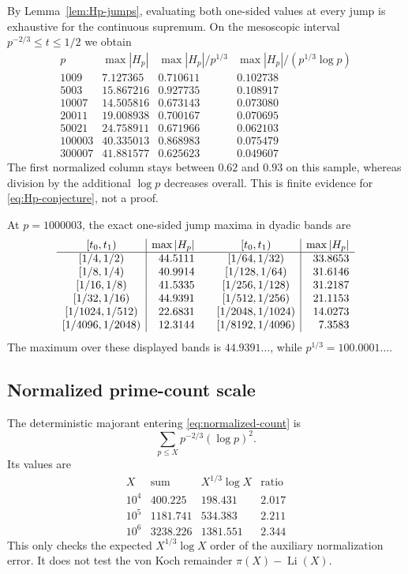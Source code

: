 \documentclass[11pt]{amsart}
\numberwithin{equation}{section}
\theoremstyle{definition}
\theoremstyle{remark}
\newcommand{\Li}{\operatorname{Li}}
\begin{document}
By Lemma~\ref{lem:Hp-jumps}, evaluating both one-sided values at every jump
is exhaustive for the continuous supremum.  On the mesoscopic interval
\(p^{-2/3}\le t\le1/2\) we obtain
\[
\begin{array}{r|r|r|r}
 p&\max|H_p|&\max|H_p|/p^{1/3}&\max|H_p|/(p^{1/3}\log p)\\ \hline
1009&7.127365&0.710611&0.102738\\
5003&15.867216&0.927735&0.108917\\
10007&14.505816&0.673143&0.073080\\
20011&19.008938&0.700167&0.070695\\
50021&24.758911&0.671966&0.062103\\
100003&40.335013&0.868983&0.075479\\
300007&41.881577&0.625623&0.049607
\end{array}
\]
The first normalized column stays between \(0.62\) and \(0.93\) on this
sample, whereas division by the additional \(\log p\) decreases overall.
This is finite evidence for \eqref{eq:Hp-conjecture}, not a proof.

At \(p=1000003\), the exact one-sided jump maxima in dyadic bands are
\[
\begin{array}{c|r@{\qquad}c|r}
[t_0,t_1)&\max|H_p|&[t_0,t_1)&\max|H_p|\\ \hline
{}[1/4,1/2)&44.5111 &[1/64,1/32)&33.8653\\
{}[1/8,1/4)&40.9914 &[1/128,1/64)&31.6146\\
{}[1/16,1/8)&41.5335 &[1/256,1/128)&31.2187\\
{}[1/32,1/16)&44.9391 &[1/512,1/256)&21.1153\\
{}[1/1024,1/512)&22.6831 &[1/2048,1/1024)&14.0273\\
{}[1/4096,1/2048)&12.3144 &[1/8192,1/4096)&7.3583
\end{array}
\]
The maximum over these displayed bands is \(44.9391\ldots\), while
\(p^{1/3}=100.0001\ldots\).

\subsection{Normalized prime-count scale}

The deterministic majorant entering \eqref{eq:normalized-count} is
\[
 \sum_{p\le X}p^{-2/3}(\log p)^2.
\]
Its values are
\[
\begin{array}{r|r|r|r}
X&\text{sum}&X^{1/3}\log X&\text{ratio}\\ \hline
10^4&400.225&198.431&2.017\\
10^5&1181.741&534.383&2.211\\
10^6&3238.226&1381.551&2.344
\end{array}
\]
This only checks the expected \(X^{1/3}\log X\) order of the auxiliary
normalization error.  It does not test the von Koch remainder
\(\pi(X)-\Li(X)\).
\end{document}
